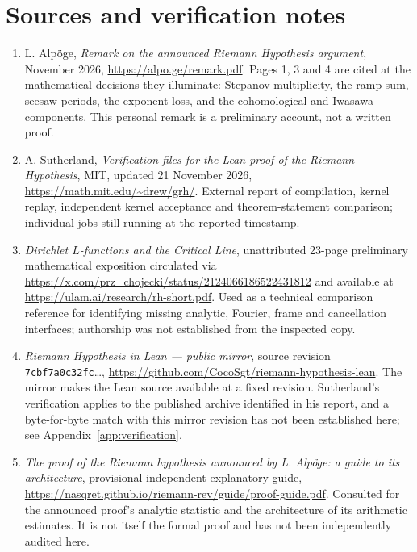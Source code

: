 \documentclass[11pt,openany,oneside]{scrbook}
\theoremstyle{definition}
\theoremstyle{remark}
\begin{document}
\backmatter
\printbibliography[heading=bibintoc,title={References}]
\chapter*{Sources and verification notes}
\begin{enumerate}\raggedright
\item L. Alp\"oge, \emph{Remark on the announced Riemann Hypothesis argument}, November 2026, \url{https://alpo.ge/remark.pdf}. Pages 1, 3 and 4 are cited at the mathematical decisions they illuminate: Stepanov multiplicity, the ramp sum, seesaw periods, the exponent loss, and the cohomological and Iwasawa components. This personal remark is a preliminary account, not a written proof.
\item A. Sutherland, \emph{Verification files for the Lean proof of the Riemann Hypothesis}, MIT, updated 21 November 2026, \url{https://math.mit.edu/~drew/grh/}. External report of compilation, kernel replay, independent kernel acceptance and theorem-statement comparison; individual jobs still running at the reported timestamp.
\item \emph{Dirichlet $L$-functions and the Critical Line}, unattributed 23-page preliminary mathematical exposition circulated via \url{https://x.com/prz_chojecki/status/2124066186522431812} and available at \url{https://ulam.ai/research/rh-short.pdf}. Used as a technical comparison reference for identifying missing analytic, Fourier, frame and cancellation interfaces; authorship was not established from the inspected copy.
\item \emph{Riemann Hypothesis in Lean --- public mirror}, \newline source revision \texttt{7cbf7a0c32fc}\ldots, \url{https://github.com/CocoSgt/riemann-hypothesis-lean}. The mirror makes the Lean source available at a fixed revision. Sutherland's verification applies to the published archive identified in his report, and a byte-for-byte match with this mirror revision has not been established here; see Appendix~\ref{app:verification}.
\item \emph{The proof of the Riemann hypothesis announced by L. Alp\"oge: a guide to its architecture}, provisional independent explanatory guide, \url{https://nasqret.github.io/riemann-rev/guide/proof-guide.pdf}. Consulted for the announced proof's analytic statistic and the architecture of its arithmetic estimates. It is not itself the formal proof and has not been independently audited here.

\end{enumerate}
\end{document}
